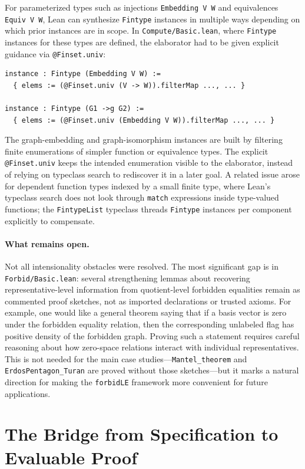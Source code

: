 \documentclass{article}
\newcommand{\lean}[1]{\texttt{#1}}
\begin{document}
For parameterized types such as injections \lean{Embedding V W} and
equivalences \lean{Equiv V W}, Lean can synthesize \lean{Fintype} instances in
multiple ways depending on which prior instances are in scope.  In
\lean{Compute/Basic.lean}, where \lean{Fintype} instances for these types are
defined, the elaborator had to be given explicit guidance via
\lean{@Finset.univ}:
\begin{lstlisting}
instance : Fintype (Embedding V W) :=
  { elems := (@Finset.univ (V -> W)).filterMap ..., ... }

instance : Fintype (G1 ->g G2) :=
  { elems := (@Finset.univ (Embedding V W)).filterMap ..., ... }
\end{lstlisting}
The graph-embedding and graph-isomorphism instances are built by filtering
finite enumerations of simpler function or equivalence types.  The explicit
\lean{@Finset.univ} keeps the intended enumeration visible to the elaborator,
instead of relying on typeclass search to rediscover it in a later goal.
A related issue arose for dependent function types indexed by a small finite
type, where Lean's typeclass search does not look through \lean{match}
expressions inside type-valued functions; the \lean{FintypeList} typeclass
threads \lean{Fintype} instances per component explicitly to compensate.

\paragraph{What remains open.}
Not all intensionality obstacles were resolved.  The most significant gap is
in \lean{Forbid/Basic.lean}: several strengthening lemmas about recovering
representative-level information from quotient-level forbidden equalities
remain as commented proof sketches, not as imported declarations or trusted
axioms.  For example, one would like a general theorem saying that if a
basis vector is zero under the forbidden equality relation, then the
corresponding unlabeled flag has positive density of the forbidden graph.
Proving such a statement requires careful reasoning about how zero-space
relations interact with individual representatives.  This is not needed for
the main case studies---\lean{Mantel\_theorem} and \lean{ErdosPentagon\_Turan}
are proved without those sketches---but it marks a natural direction for
making the \lean{forbidLE} framework more convenient for future applications.


\section{The Bridge from Specification to Evaluable Proof}
\label{sec:bridge}
\end{document}

